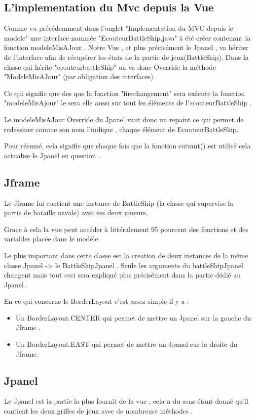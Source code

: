 \documentclass[a4paper,12pt]{article} %
\begin{document}
\subsection{L'implementation du Mvc depuis la Vue}
Comme vu précédemment dans l'onglet "Implementation du MVC depuis le modele" une interface nommée "EcouteurBattleShip.java" à été créer contenant la fonction modeleMisAJour .
Notre Vue , et plus précisément le Jpanel , va hériter de l'interface afin de récupérer les états de la partie de jeux(BattleShip).
Dans la classe qui hérite "ecouteurbattleShip" on va donc Override   la méthode "ModeleMisAJour" (par obligation des interfaces). 

Ce qui signifie que des que la fonction "firechangement" sera exécute la fonction "modeleMisAjour" le sera elle aussi sur tout les éléments de l'ecouteurBattleShip .

Le modeleMisAJour Override du Jpanel vaut donc un repaint ce qui permet de redessiner comme son nom l'indique , chaque élément de EcouteurBattleShip.

Pour résumé, cela signifie que chaque fois que la fonction suivant() est utilisé cela actualise le Jpanel en question .   

\subsection{Jframe}
Le Jframe lui contient une instance de BattleShip (la classe qui supervise la partie de bataille navale) avec ses deux joueurs.

Grace à cela la vue peut accéder à littéralement 95 pourcent des fonctions et des variables placée dans le modèle.

Le plus important dans cette classe est la creation de deux instances de la même classe Jpanel -> le BattleShipJpanel .
Seule les arguments du battleShipJpanel changent mais tout ceci sera expliqué plus précisément dans la partie dédié au Jpanel .

En ce qui concerne le BorderLayout c'est assez simple il y a :
\begin{itemize}
\item Un BorderLayout.CENTER qui permet de mettre un Jpanel sur la gauche du Jframe .
\item Un BorderLayout.EAST qui permet de mettre un Jpanel sur la droite du Jframe.
\end{itemize}


\subsection{Jpanel}
Le Jpanel est la partie la plus fournit de la vue , cela a du sens étant donné qu'il contient les deux grilles de jeux avec de nombreuse méthodes  .
\end{document}
